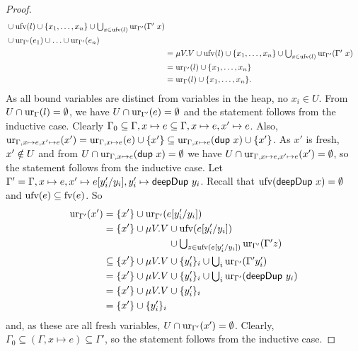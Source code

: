 \documentclass[preprint]{sigplanconf}
\theoremstyle{nonumberplain}
\newtheorem{proof}{Proof}
\begin{document}
\begin{proof}
\begin{align*}
\begin{aligned}[t]
&\cup \text{ufv}(l) \cup \{x_1,\ldots,x_n\} \cup \textstyle\bigcup_{x\in \text{ufv}(l)}\text{ur}_{\Gamma'}(\Gamma'\ x) \\
&\cup \text{ur}_{\Gamma'}(e_1) \cup \ldots \cup \text{ur}_{\Gamma'}(e_n)
\end{aligned}\\
&= \mu V. V \cup \text{ufv}(l) \cup \{x_1,\ldots,x_n\} \cup \textstyle\bigcup_{x\in \text{ufv}(l)}\text{ur}_{\Gamma'}(\Gamma'\ x)\\
&= \text{ur}_{\Gamma'}(l) \cup \{x_1,\ldots,x_n\}\\
&= \text{ur}_{\Gamma}(l) \cup \{x_1,\ldots,x_n\}.
\end{align*}
As all bound variables are distinct from variables in the heap, no $x_i\in U$. From $U\cap \text{ur}_{\Gamma}(l)
= \emptyset$, we have $U \cap \text{ur}_{\Gamma'}(e) = \emptyset$ and the statement
follows from the inductive case.
Clearly $\Gamma_0 \subseteq \Gamma, x\mapsto e \subseteq \Gamma, x\mapsto e, x' \mapsto e$. Also, $\text{ur}_{\Gamma,x\mapsto e, x'\mapsto e}(x') = \text{ur}_{\Gamma, x\mapsto e}(e) \cup \{x'\} \subseteq \text{ur}_{\Gamma, x\mapsto e}(\text{\textsf{dup}}\ x) \cup \{x'\}$. As $x'$ is fresh, $x'\notin U$ and from $U \cap \text{ur}_{\Gamma, x\mapsto e}(\text{\textsf{dup}}\ x)= \emptyset$ we have $U \cap \text{ur}_{\Gamma,x\mapsto e, x' \mapsto e}(x')=\emptyset$, so the statement follows from the inductive case.
Let $\Gamma' = \Gamma, x\mapsto e, x'\mapsto e[y'_i/y_i], y'_i \mapsto \text{\textsf{deepDup}}\ y_i$.
Recall that $\text{ufv}(\text{\textsf{deepDup}}\ x)=\emptyset$ and $\text{ufv}(e) \subseteq \text{fv}(e)$. So 
\begin{align*}
\text{ur}_{\Gamma'}(x')
&= \{x'\} \cup \text{ur}_{\Gamma'}(e[y'_i/y_i]) \\
&= \{x'\} \cup \mu V. V
\begin{aligned}[t]
&\cup \text{ufv}(e[y'_i / y_i])\\
&\cup \textstyle\bigcup_{z \in \text{ufv}(e[y'_i / y_i])} \text{ur}_{\Gamma'}(\Gamma' z)
\end{aligned}\\
&\subseteq \{x'\} \cup \mu V. V \cup \{y'_i\}_i \cup \textstyle\bigcup_{i} \text{ur}_{\Gamma'}(\Gamma' y'_i) \\
&= \{x'\} \cup \mu V. V \cup \{y'_i\}_i \cup \textstyle\bigcup_{i} \text{ur}_{\Gamma'}(\text{\textsf{deepDup}}\ y_i)\\
&= \{x'\} \cup \mu V. V \cup \{y'_i\}_i  \\
&= \{x'\} \cup \{y'_i\}_i
\end{align*}
and, as these are all fresh variables, $U \cap \text{ur}_{\Gamma'}(x') = \emptyset$. Clearly, $\Gamma_0 \subseteq (\Gamma, x\mapsto e) \subseteq \Gamma'$, so the statement follows from the inductive case.
\end{proof}
\end{document}
